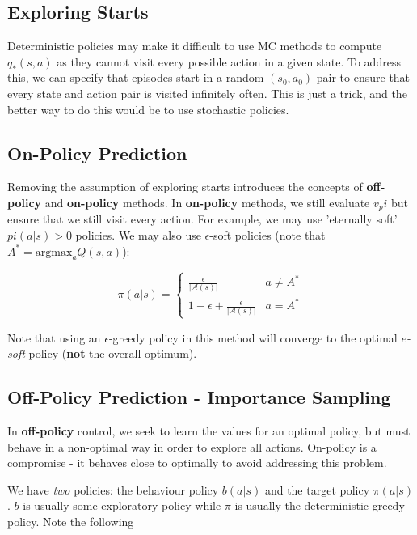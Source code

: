 \documentclass[11pt]{report}
\begin{document}
\subsection{Exploring Starts}
Deterministic policies may make it difficult to use MC methods to compute $q_*(s,a)$ as they cannot visit every possible action in a given state. To address this, we can specify that episodes start in a random $(s_0, a_0)$ pair to ensure that every state and action pair is visited infinitely often. This is just a trick, and the better way to do this would be to use stochastic policies.

\subsection{On-Policy Prediction}
Removing the assumption of exploring starts introduces the concepts of \textbf{off-policy} and \textbf{on-policy} methods. In \textbf{on-policy} methods, we still evaluate $v_pi$ but ensure that we still visit every action. For example, we may use 'eternally soft' $pi(a|s) > 0$ policies. We may also use $\epsilon$-soft policies (note that $A^*=\text{argmax}_{a}Q(s,a)$):

\begin{equation}
	\label{eqn:e-soft-policy}
	\pi(a|s) = \begin{cases}
 		\frac{\epsilon}{|\mathcal{A}(s)|} & a \neq A^*\\
 		1 - \epsilon + \frac{\epsilon}{|\mathcal{A}(s)|} & a = A^*
 	\end{cases}
\end{equation}

Note that using an $\epsilon$-greedy policy in this method will converge to the optimal \textit{$e$-soft} policy (\textbf{not} the overall optimum).

\subsection{Off-Policy Prediction - Importance Sampling}\label{sec:importance-sampling}
In \textbf{off-policy} control, we seek to learn the values for an optimal policy, but must behave in a non-optimal way in order to explore all actions. On-policy is a compromise - it behaves close to optimally to avoid addressing this problem.

We have \textit{two} policies: the behaviour policy $b(a|s)$ and the target policy $\pi(a|s)$. $b$ is usually some exploratory policy while $\pi$ is usually the deterministic greedy policy. Note the following
\end{document}
